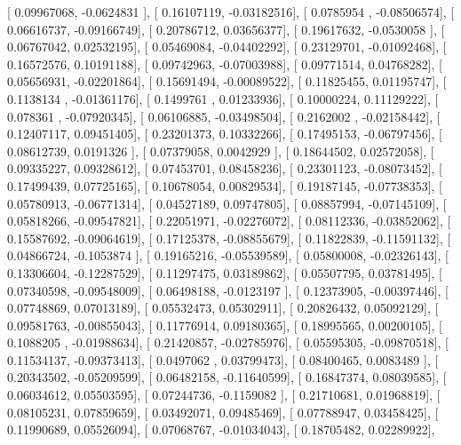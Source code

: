 \documentclass{article}
\begin{document}
       [ 0.09967068, -0.0624831 ],
       [ 0.16107119, -0.03182516],
       [ 0.0785954 , -0.08506574],
       [ 0.06616737, -0.09166749],
       [ 0.20786712,  0.03656377],
       [ 0.19617632, -0.0530058 ],
       [ 0.06767042,  0.02532195],
       [ 0.05469084, -0.04402292],
       [ 0.23129701, -0.01092468],
       [ 0.16572576,  0.10191188],
       [ 0.09742963, -0.07003988],
       [ 0.09771514,  0.04768282],
       [ 0.05656931, -0.02201864],
       [ 0.15691494, -0.00089522],
       [ 0.11825455,  0.01195747],
       [ 0.1138134 , -0.01361176],
       [ 0.1499761 ,  0.01233936],
       [ 0.10000224,  0.11129222],
       [ 0.078361  , -0.07920345],
       [ 0.06106885, -0.03498504],
       [ 0.2162002 , -0.02158442],
       [ 0.12407117,  0.09451405],
       [ 0.23201373,  0.10332266],
       [ 0.17495153, -0.06797456],
       [ 0.08612739,  0.0191326 ],
       [ 0.07379058,  0.0042929 ],
       [ 0.18644502,  0.02572058],
       [ 0.09335227,  0.09328612],
       [ 0.07453701,  0.08458236],
       [ 0.23301123, -0.08073452],
       [ 0.17499439,  0.07725165],
       [ 0.10678054,  0.00829534],
       [ 0.19187145, -0.07738353],
       [ 0.05780913, -0.06771314],
       [ 0.04527189,  0.09747805],
       [ 0.08857994, -0.07145109],
       [ 0.05818266, -0.09547821],
       [ 0.22051971, -0.02276072],
       [ 0.08112336, -0.03852062],
       [ 0.15587692, -0.09064619],
       [ 0.17125378, -0.08855679],
       [ 0.11822839, -0.11591132],
       [ 0.04866724, -0.1053874 ],
       [ 0.19165216, -0.05539589],
       [ 0.05800008, -0.02326143],
       [ 0.13306604, -0.12287529],
       [ 0.11297475,  0.03189862],
       [ 0.05507795,  0.03781495],
       [ 0.07340598, -0.09548009],
       [ 0.06498188, -0.0123197 ],
       [ 0.12373905, -0.00397446],
       [ 0.07748869,  0.07013189],
       [ 0.05532473,  0.05302911],
       [ 0.20826432,  0.05092129],
       [ 0.09581763, -0.00855043],
       [ 0.11776914,  0.09180365],
       [ 0.18995565,  0.00200105],
       [ 0.1088205 , -0.01988634],
       [ 0.21420857, -0.02785976],
       [ 0.05595305, -0.09870518],
       [ 0.11534137, -0.09373413],
       [ 0.0497062 ,  0.03799473],
       [ 0.08400465,  0.0083489 ],
       [ 0.20343502, -0.05209599],
       [ 0.06482158, -0.11640599],
       [ 0.16847374,  0.08039585],
       [ 0.06034612,  0.05503595],
       [ 0.07244736, -0.1159082 ],
       [ 0.21710681,  0.01968819],
       [ 0.08105231,  0.07859659],
       [ 0.03492071,  0.09485469],
       [ 0.07788947,  0.03458425],
       [ 0.11990689,  0.05526094],
       [ 0.07068767, -0.01034043],
       [ 0.18705482,  0.02289922],
\end{document}
